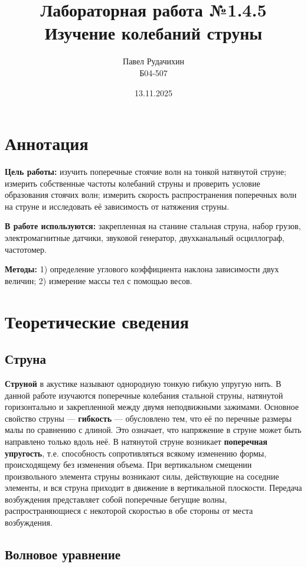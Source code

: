 \documentclass{article}
\title{Лабораторная работа №1.4.5 \\ Изучение колебаний струны}
\author{Павел Рудачихин \\ Б04-507}
\date{13.11.2025}
\begin{document}
\maketitle{}
\section* {Аннотация} 

\hspace{4mm} \textbf{Цель работы:} изучить поперечные стоячие волн на тонкой натянутой струне;
измерить собственные частоты колебаний струны и проверить условие образования стоячих волн; 
измерить скорость распространения поперечных волн на струне и исследовать её зависимость от натяжения струны.

\textbf{В работе используются:} закрепленная на станине стальная струна, набор грузов, электромагнитные датчики, звуковой генератор, двухканальный осциллограф, частотомер.

\textbf{Методы:} 1) определение  углового  коэффициента  наклона  зависимости двух величин; 2) измерение массы тел с помощью весов.

\section* {Теоретические сведения}
\subsection* {Струна}

\hspace{4mm} \textbf{Струной} в акустике называют однородную тонкую гибкую упругую нить. В данной работе изучаются поперечные колебания стальной струны, натянутой горизонтально и закрепленной между двумя неподвижными зажимами.
Основное свойство струны — \textbf{гибкость} — обусловлено тем, что её по перечные размеры малы по сравнению с длиной. Это означает, что напряжение в струне может быть направлено только вдоль неё.
В натянутой струне возникает \textbf{поперечная упругость}, т.е. способность сопротивляться всякому изменению формы, происходящему без изменения объема. При вертикальном смещении произвольного элемента струны возникают силы, действующие на соседние элементы, и вся струна приходит в движение в вертикальной плоскости. Передача возбуждения представляет собой поперечные бегущие волны, распространяющиеся с некоторой скоростью в обе стороны от места возбуждения.

\subsection* {Волновое уравнение}
\end{document}

